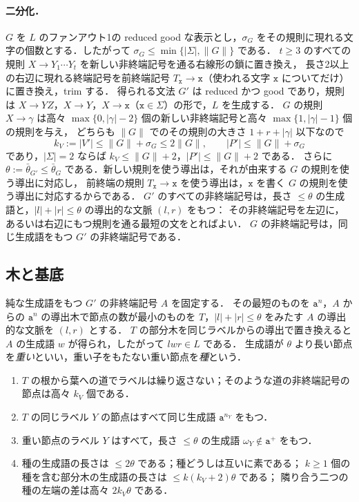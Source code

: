 \paragraph{二分化．}
$G$ を $L$ のファンアウト1の reduced good な表示とし，$\sigma_G$ をその規則に現れる文字の個数とする．したがって $\sigma_G\le\min\{|\Sigma|,\|G\|\}$ である．
$t\ge3$ のすべての規則 $X\to Y_1\cdots Y_t$ を新しい非終端記号を通る右線形の鎖に置き換え，
長さ2以上の右辺に現れる終端記号を前終端記号 $T_{\mathtt x}\to\mathtt x$（使われる文字 $\mathtt x$ についてだけ）に置き換え，trim する．
得られる文法 $G'$ は reduced かつ good であり，規則は $X\to YZ$，$X\to Y$，$X\to\mathtt x$（$\mathtt x\in\Sigma$）の形で，$L$ を生成する．
$G$ の規則 $X\to\gamma$ は高々 $\max\{0,|\gamma|-2\}$ 個の新しい非終端記号と高々 $\max\{1,|\gamma|-1\}$ 個の規則を与え，
どちらも $\|G\|$ でのその規則の大きさ $1+r+|\gamma|$ 以下なので
\[
 k_V:=|V'|\le\|G\|+\sigma_G\le2\|G\|,\qquad |P'|\le\|G\|+\sigma_G
\]
であり，$|\Sigma|=2$ ならば $k_V\le\|G\|+2$，$|P'|\le\|G\|+2$ である．
さらに $\theta:=\bar\theta_{G'}\le\bar\theta_G$ である．新しい規則を使う導出は，それが由来する $G$ の規則を使う導出に対応し，
前終端の規則 $T_{\mathtt x}\to\mathtt x$ を使う導出は，$\mathtt x$ を書く $G$ の規則を使う導出に対応するからである．
$G'$ のすべての非終端記号は，長さ $\le\theta$ の生成語と，$|l|+|r|\le\theta$ の導出的な文脈 $(l,r)$ をもつ：
その非終端記号を左辺に，あるいは右辺にもつ規則を通る最短の文をとればよい．
$G$ の非終端記号は，同じ生成語をもつ $G'$ の非終端記号である．

\subsection{木と基底}

純な生成語をもつ $G'$ の非終端記号 $A$ を固定する．
その最短のものを $\mathtt a^n$，$A$ からの $\mathtt a^n$ の導出木で節点の数が最小のものを $T$，$|l|+|r|\le\theta$ をみたす $A$ の導出的な文脈を $(l,r)$ とする．
$T$ の部分木を同じラベルからの導出で置き換えると $A$ の生成語 $w$ が得られ，したがって $lwr\in L$ である．
生成語が $\theta$ より長い節点を\emph{重い}といい，重い子をもたない重い節点を\emph{種}という．

\begin{lemma}
\label{lem:app-h-tree}
\begin{enumerate}[label=\textup{(\alph*)},leftmargin=*]
\item $T$ の根から葉への道でラベルは繰り返さない；そのような道の非終端記号の節点は高々 $k_V$ 個である．
\item $T$ の同じラベル $Y$ の節点はすべて同じ生成語 $\mathtt a^{n_Y}$ をもつ．
\item 重い節点のラベル $Y$ はすべて，長さ $\le\theta$ の生成語 $\omega_Y\notin\mathtt a^+$ をもつ．
\item 種の生成語の長さは $\le2\theta$ である；種どうしは互いに素である；
$k\ge1$ 個の種を含む部分木の生成語の長さは $\le k(k_V+2)\theta$ である；
隣り合う二つの種の左端の差は高々 $2k_V\theta$ である．
\end{enumerate}
\end{lemma}

